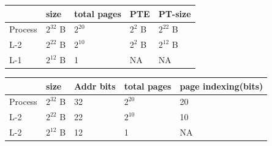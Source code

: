 \begin{enumerate}
\begin{minipage}{\linewidth}
    \begin{myTableStyle}
      \begin{tabular}{ |m{2cm}|m{2cm}|m{2cm}|m{2cm}|m{2cm}| } \hline
                  &  size           & total pages   & PTE         &  PT-size        \\ \hline
          Process &  \(2^{32}\) B   &  \(2^{20}\)   &  \(2^2\) B  &  \(2^{22}\) B   \\ \hline
          L-2     &  \(2^{22}\) B   &  \(2^{10}\)   &  \(2^2\) B  &  \(2^{12}\) B   \\ \hline
          L-1     &  \(2^{12}\) B   &  1            &  NA         &  NA             \\ \hline
      \end{tabular}
    \end{myTableStyle}
    \vspace{0.08in}

    \begin{myTableStyle}
      \begin{tabular}{ |m{2cm}|m{2cm}|m{2cm}|m{2cm}|m{2cm}| } \hline
                  &  size           & Addr bits     & total pages     &  page indexing(bits)  \\ \hline
          Process &  \(2^{32}\) B   &  32           &  \(2^{20}\)     &  20                   \\ \hline
          L-2     &  \(2^{22}\) B   &  22           &  \(2^{10}\)     &  10                   \\ \hline
          L-2     &  \(2^{12}\) B   &  12           &  1              &  NA                   \\ \hline
      \end{tabular}
    \end{myTableStyle}

    \end{minipage}


\end{enumerate}









